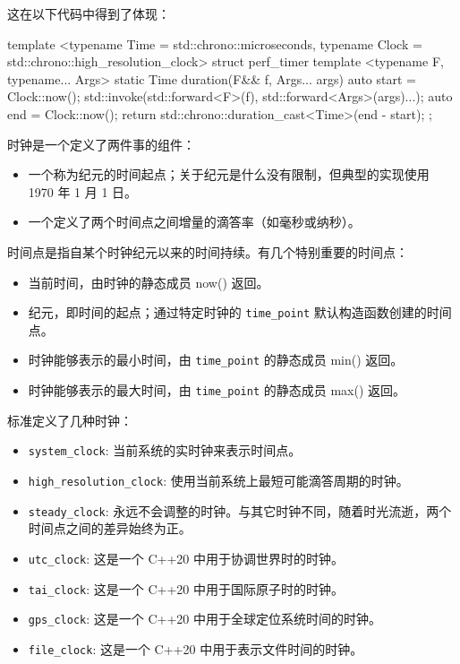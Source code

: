 这在以下代码中得到了体现：

\begin{cpp}
template <typename Time = std::chrono::microseconds,
          typename Clock = std::chrono::high_resolution_clock>
struct perf_timer
{
    template <typename F, typename... Args>
    static Time duration(F&& f, Args... args)
    {
        auto start = Clock::now();
        std::invoke(std::forward<F>(f), std::forward<Args>(args)...);
        auto end = Clock::now();
        return std::chrono::duration_cast<Time>(end - start);
    }
};
\end{cpp}


时钟是一个定义了两件事的组件：

\begin{itemize}
\item
一个称为纪元的时间起点；关于纪元是什么没有限制，但典型的实现使用 1970 年 1 月 1 日。

\item
一个定义了两个时间点之间增量的滴答率（如毫秒或纳秒）。
\end{itemize}

时间点是指自某个时钟纪元以来的时间持续。有几个特别重要的时间点：

\begin{itemize}
\item
当前时间，由时钟的静态成员 now() 返回。

\item
纪元，即时间的起点；通过特定时钟的 \verb|time_point| 默认构造函数创建的时间点。

\item
时钟能够表示的最小时间，由 \verb|time_point| 的静态成员 min() 返回。

\item
时钟能够表示的最大时间，由 \verb|time_point| 的静态成员 max() 返回。
\end{itemize}

标准定义了几种时钟：

\begin{itemize}
\item
\verb|system_clock|: 当前系统的实时钟来表示时间点。

\item
\verb|high_resolution_clock|: 使用当前系统上最短可能滴答周期的时钟。

\item
\verb|steady_clock|: 永远不会调整的时钟。与其它时钟不同，随着时光流逝，两个时间点之间的差异始终为正。

\item
\verb|utc_clock|: 这是一个 C++20 中用于协调世界时的时钟。

\item
\verb|tai_clock|: 这是一个 C++20 中用于国际原子时的时钟。

\item
\verb|gps_clock|: 这是一个 C++20 中用于全球定位系统时间的时钟。

\item
\verb|file_clock|: 这是一个 C++20 中用于表示文件时间的时钟。
\end{itemize}

